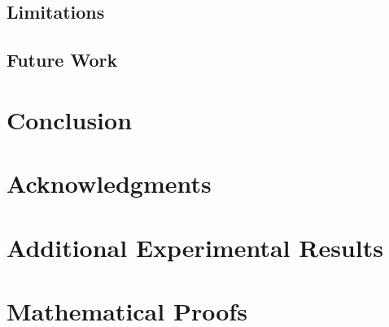 \documentclass[11pt,a4paper]{article}
\begin{document}
\subsection{Limitations}
\label{subsec:limitations}


\subsection{Future Work}
\label{subsec:future_work}


\section{Conclusion}
\label{sec:conclusion}


\section*{Acknowledgments}




\appendix
\section{Additional Experimental Results}
\label{app:additional_results}


\section{Mathematical Proofs}
\label{app:proofs}

\end{document}
